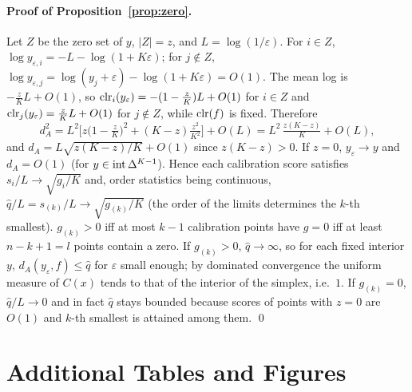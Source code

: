 \paragraph{Proof of Proposition~\ref{prop:zero}.}
Let $Z$ be the zero set of $y$, $|Z|=z$, and $L=\log(1/\varepsilon)$. For $i\in Z$, $\log y_{\varepsilon,i}=-L-\log(1+K\varepsilon)$; for $j\notin Z$, $\log y_{\varepsilon,j}=\log(y_j+\varepsilon)-\log(1+K\varepsilon)=O(1)$. The mean log is $-\frac zKL+O(1)$, so $\mathrm{clr}_i(y_\varepsilon)=-(1-\frac zK)L+O(1)$ for $i\in Z$ and $\mathrm{clr}_j(y_\varepsilon)=\frac zKL+O(1)$ for $j\notin Z$, while $\mathrm{clr}(f)$ is fixed. Therefore
\[
d_A^2=L^2\Big[z\big(1-\tfrac zK\big)^2+(K-z)\tfrac{z^2}{K^2}\Big]+O(L)=L^2\,\tfrac{z(K-z)}K+O(L),
\]
and $d_A=L\sqrt{z(K-z)/K}+O(1)$ since $z(K-z)>0$. If $z=0$, $y_\varepsilon\to y$ and $d_A=O(1)$ (for $y\in\mathrm{int}\,\Delta^{K-1}$). Hence each calibration score satisfies $s_i/L\to\sqrt{g_i/K}$ and, order statistics being continuous, $\hat q/L=s_{(k)}/L\to\sqrt{g_{(k)}/K}$ (the order of the limits determines the $k$-th smallest). $g_{(k)}>0$ iff at most $k-1$ calibration points have $g=0$ iff at least $n-k+1=l$ points contain a zero. If $g_{(k)}>0$, $\hat q\to\infty$, so for each fixed interior $y$, $d_A(y_\varepsilon,f)\le\hat q$ for $\varepsilon$ small enough; by dominated convergence the uniform measure of $C(x)$ tends to that of the interior of the simplex, i.e.\ $1$. If $g_{(k)}=0$, $\hat q/L\to0$ and in fact $\hat q$ stays bounded because scores of points with $z=0$ are $O(1)$ and $k$-th smallest is attained among them. \qed

\section{Additional Tables and Figures}
\label{app:tables}

\begin{table}[h]
\caption{Validity of the eight non-Mondrian scores over all 36 synthetic cells (200 replicates each). $z$: deviation of mean coverage from the exact expectation $\lceil(n+1)(0.9)\rceil/(n+1)$ divided by its standard error over replicates.}
\label{tab:validity}
\centering\small

\end{table}

\begin{table}[h]
\caption{Coverage given the calibration set vs.\ the Beta law of Prop.~\ref{prop:beta} ($2\times10^4$ calibration sets per row; reference cdf from $4\times10^6$ draws; $\alpha=0.1$, $K=3$, oracle predictor).}
\label{tab:beta}
\centering\small

\end{table}

